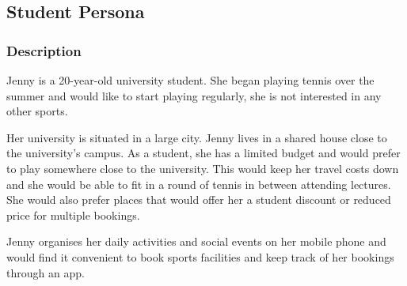
\subsection{Student Persona}
\label{sub:student_persona}


\subsubsection*{Description}
\label{ssub:Student-description}

Jenny is a 20-year-old university student. She began playing tennis
over the summer and would like to start playing regularly, she is not
interested in any other sports.

Her university is situated in a large city. Jenny lives in a shared
house close to the university’s campus. As a student, she has a limited
budget and would prefer to play somewhere close to the university. This
would keep her travel costs down and she would be able to fit in a
round of tennis in between attending lectures. She would also prefer
places that would offer her a student discount or reduced price for
multiple bookings.

Jenny organises her daily activities and social events on her mobile
phone and would find it convenient to book sports facilities and keep
track of her bookings through an app.


